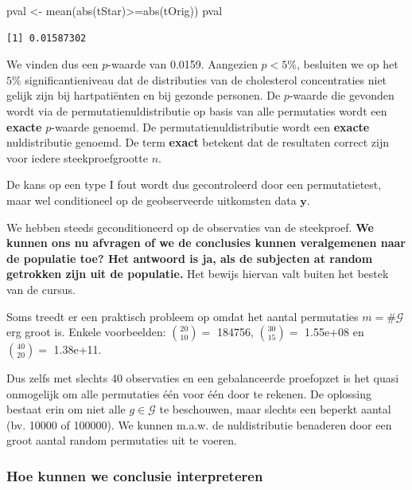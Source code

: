 \documentclass[
  dutch,
  letterpaper,
  12pt]{book}
\newenvironment{Shaded}{\begin{snugshade}}{\end{snugshade}}
\newcommand{\FunctionTok}[1]{\textcolor[rgb]{0.28,0.35,0.67}{#1}}
\newcommand{\NormalTok}[1]{\textcolor[rgb]{0.00,0.23,0.31}{#1}}
\newcommand{\OtherTok}[1]{\textcolor[rgb]{0.00,0.23,0.31}{#1}}
\newcommand{\SpecialCharTok}[1]{\textcolor[rgb]{0.37,0.37,0.37}{#1}}
\theoremstyle{definition}
\theoremstyle{definition}
\theoremstyle{definition}
\theoremstyle{remark}
\begin{document}
\begin{Shaded}
\begin{Highlighting}[]
\NormalTok{pval }\OtherTok{\textless{}{-}} \FunctionTok{mean}\NormalTok{(}\FunctionTok{abs}\NormalTok{(tStar)}\SpecialCharTok{\textgreater{}=}\FunctionTok{abs}\NormalTok{(tOrig))}
\NormalTok{pval}
\end{Highlighting}
\end{Shaded}

\begin{verbatim}
[1] 0.01587302
\end{verbatim}

We vinden dus een \(p\)-waarde van 0.0159. Aangezien \(p<5\%\),
besluiten we op het \(5\%\) significantieniveau dat de distributies van
de cholesterol concentraties niet gelijk zijn bij hartpatiënten en bij
gezonde personen. De \(p\)-waarde die gevonden wordt via de
permutatienuldistributie op basis van alle permutaties wordt een
\textbf{exacte} \(p\)-waarde genoemd. De permutatienuldistributie wordt
een \textbf{exacte} nuldistributie genoemd. De term \textbf{exact}
betekent dat de resultaten correct zijn voor iedere steekproefgrootte
\(n\).

De kans op een type I fout wordt dus gecontroleerd door een
permutatietest, maar wel conditioneel op de geobserveerde uitkomsten
data \(\mathbf{y}\).

We hebben steeds geconditioneerd op de observaties van de steekproef.
\textbf{We kunnen ons nu afvragen of we de conclusies kunnen
veralgemenen naar de populatie toe? Het antwoord is ja, als de subjecten
at random getrokken zijn uit de populatie.} Het bewijs hiervan valt
buiten het bestek van de cursus.

Soms treedt er een praktisch probleem op omdat het aantal permutaties
\(m=\#{\mathcal{G}}\) erg groot is. Enkele voorbeelden:
\(\binom{20}{10}=\) 184756, \(\binom{30}{15}=\) 1.55e+08 en
\(\binom{40}{20}=\) 1.38e+11.

Dus zelfs met slechts 40 observaties en een gebalanceerde proefopzet is
het quasi onmogelijk om alle permutaties één voor één door te rekenen.
De oplossing bestaat erin om niet alle \(g \in {\mathcal{G}}\) te
beschouwen, maar slechts een beperkt aantal (bv. 10000 of 100000). We
kunnen m.a.w. de nuldistributie benaderen door een groot aantal random
permutaties uit te voeren.

\subsubsection{Hoe kunnen we conclusie
interpreteren}\label{hoe-kunnen-we-conclusie-interpreteren}
\end{document}
